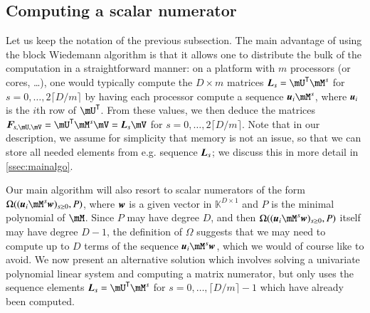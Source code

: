 \documentclass[final,1p,times,authoryear]{elsarticle}
\newcommand{\mat}[1]{\bm{\MakeUppercase{#1}}} %
\newcommand{\row}[1]{\bm{\MakeLowercase{#1}}} %
\newcommand{\col}[1]{\bm{\MakeLowercase{#1}}} %
\newcommand{\seqelt}[1]{\bm{F}_{#1}} %
\newcommand{\minpoly}{P}
\newcommand{\trsp}[1]{#1^{\mathsf{T}}} %
\def\K{\mathbb{K}}
\def\K {\ensuremath{\mathbb{K}}}
\newcommand{\mUt}{\trsp{\mU}}
\begin{document}
\subsection{Computing a scalar numerator}\label{ssec:scalar_numer}

Let us keep the notation of the previous subsection.  The main
advantage of using the block Wiedemann algorithm is that it allows one
to distribute the bulk of the computation in a straightforward manner:
on a platform with $m$ processors (or cores, \dots), one would
typically compute the $D \times m$ matrices $\mat{L}_s=\mUt\mM^s$
for $s=0,\dots,2\lceil D/m \rceil$ by having each processor compute a
sequence $\row{u}_i \mM^s$, where $\row{u}_i$ is the $i$th row of
$\mUt$. From these values, we then deduce the matrices
$\seqelt{s,\mU,\mV}=\mUt \mM^s \mV = \mat{L}_s\mV$ for
$s=0,\dots,2\lceil D/m \rceil$. Note that in our description, we
assume for simplicity that memory is not an issue, so that we can
store all needed elements from e.g. sequence $\mat{L}_s$; we discuss
this in more detail in \cref{ssec:mainalgo}.

Our main algorithm will also resort to scalar numerators of
the form $\Omega((\row{u}_i \mM^s \col{w})_{s \ge 0},
\minpoly)$, where $\row{w}$ is a given vector in $\K^{D \times 1}$ and
$\minpoly$ is the minimal polynomial of $\mM$. Since $\minpoly$ may
have degree $D$, and then $\Omega((\row{u}_i \mM^s \col{w})_{s \ge 0},
\minpoly)$ itself may have degree $D-1$,
the definition of $\Omega$ suggests that we
may need to compute up to $D$ terms of the sequence $\row{u}_i \mM^s
\col{w}$, which we would of course like to avoid. We now present an
alternative solution which involves solving a univariate polynomial linear system
and computing a matrix numerator, but only uses the sequence elements
$\mat{L}_s= \mUt \mM^s$ for $s=0,\dots,\lceil D/m \rceil-1$
which have already been computed.
\end{document}

